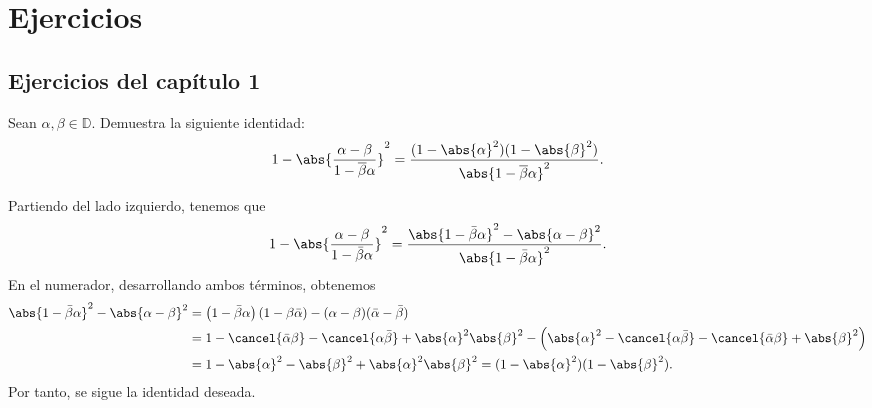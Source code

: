 \chapter{Ejercicios}

\section{Ejercicios del capítulo 1}

\begin{ejer}\label{ejer:identidad-auxiliar-disco-unidad}
    Sean $\alpha, \beta \in \mathbb{D}$. Demuestra la siguiente identidad:
    \[
    1 - \abs{\frac{\alpha - \beta}{1 - \overline{\beta} \alpha}}^2 = \frac{(1 - \abs{\alpha}^2)(1 - \abs{\beta}^2)}{\abs{1 - \overline{\beta} \alpha}^2}.
    \]
\end{ejer}
\begin{sol}
    Partiendo del lado izquierdo, tenemos que
    \[
    1 - \abs{\frac{\alpha - \beta}{1 - \bar{\beta} \alpha}}^2 = \frac{\abs{1 - \bar{\beta} \alpha}^2 - \abs{\alpha - \beta}^2}{\abs{1 - \bar{\beta} \alpha}^2}.
    \]
    En el numerador, desarrollando ambos términos, obtenemos
    \[
    \begin{aligned}
        \abs{1 - \bar{\beta} \alpha}^2 - \abs{\alpha - \beta}^2 &= \left(1 - \bar{\beta} \alpha\right)\left(1 - \beta \bar{\alpha}\right) - (\alpha - \beta)(\bar{\alpha} - \bar{\beta}) \\
        &= 1 - \cancel{\bar{\alpha} \beta} - \cancel{\alpha \bar{\beta}} + \abs{\alpha}^2 \abs{\beta}^2 - \left(\abs{\alpha}^2 - \cancel{\alpha \bar{\beta}} - \cancel{\bar{\alpha} \beta} + \abs{\beta}^2\right) \\
        &= 1 - \abs{\alpha}^2 - \abs{\beta}^2 + \abs{\alpha}^2 \abs{\beta}^2 = (1 - \abs{\alpha}^2)(1 - \abs{\beta}^2).
    \end{aligned}
    \]
    Por tanto, se sigue la identidad deseada.\hfill \qedsymbol
\end{sol}

